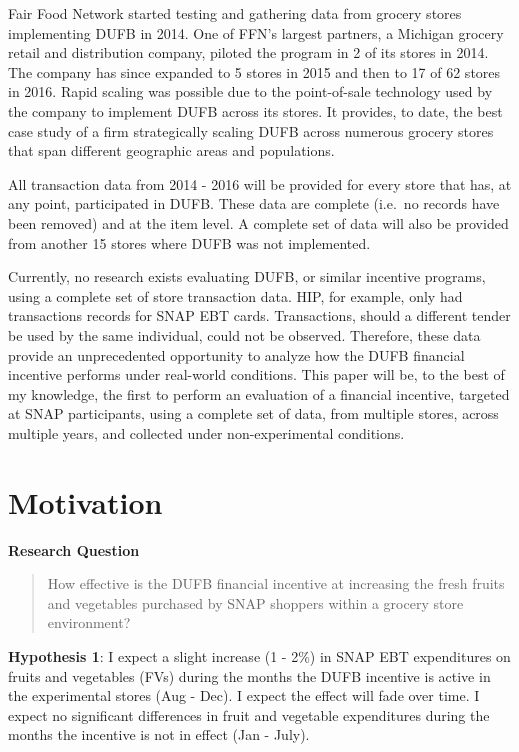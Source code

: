 \documentclass[12pt,letterpaperpaper,]{book}
\begin{document}
Fair Food Network started testing and gathering data from grocery stores
implementing DUFB in 2014. One of FFN's largest partners, a Michigan
grocery retail and distribution company, piloted the program in 2 of its
stores in 2014. The company has since expanded to 5 stores in 2015 and
then to 17 of 62 stores in 2016. Rapid scaling was possible due to the
point-of-sale technology used by the company to implement DUFB across
its stores. It provides, to date, the best case study of a firm
strategically scaling DUFB across numerous grocery stores that span
different geographic areas and populations.

All transaction data from 2014 - 2016 will be provided for every store
that has, at any point, participated in DUFB. These data are complete
(i.e.~no records have been removed) and at the item level. A complete
set of data will also be provided from another 15 stores where DUFB was
not implemented.

Currently, no research exists evaluating DUFB, or similar incentive
programs, using a complete set of store transaction data. HIP, for
example, only had transactions records for SNAP EBT cards. Transactions,
should a different tender be used by the same individual, could not be
observed. Therefore, these data provide an unprecedented opportunity to
analyze how the DUFB financial incentive performs under real-world
conditions. This paper will be, to the best of my knowledge, the first
to perform an evaluation of a financial incentive, targeted at SNAP
participants, using a complete set of data, from multiple stores, across
multiple years, and collected under non-experimental conditions.

\newpage

\section*{Motivation}\label{motivation}

\textbf{Research Question}

\begin{quote}
How effective is the DUFB financial incentive at increasing the fresh
fruits and vegetables purchased by SNAP shoppers within a grocery store
environment?
\end{quote}

\textbf{Hypothesis 1}: I expect a slight increase (1 - 2\%) in SNAP EBT
expenditures on fruits and vegetables (FVs) during the months the DUFB
incentive is active in the experimental stores (Aug - Dec). I expect the
effect will fade over time. I expect no significant differences in fruit
and vegetable expenditures during the months the incentive is not in
effect (Jan - July).
\end{document}
